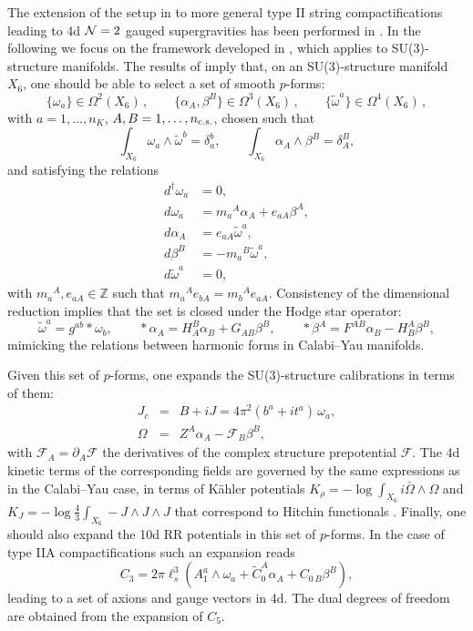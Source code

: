 \documentclass[11pt]{article}
\def\a {\alpha}
\def\b {\beta}
\def\CN {{\cal N}}
\def\be{\begin{equation}}
\def\ee{\end{equation}}
\def\bea{\begin{eqnarray}}
\def\eea{\end{eqnarray}}
\def\bes{\begin{subequations}}
\def\ees{\end{subequations}}
\def\om{\omega}
\def\Om{\Omega}
\def\p {{\partial}}
\newcommand{\cF}{\mathcal{F}}
\newcommand{\IZ}{\mathbb{Z}}
\begin{document}
The extension of the setup in \cite{Gurrieri:2002wz} to more general type II string compactifications leading to 4d $\CN=2$ gauged supergravities has been performed in \cite{DAuria:2004kwe,Grana:2005ny,Kashani-Poor:2006ofe,Grana:2006hr}. In the following we focus on the framework developed in \cite{Grana:2005ny,Kashani-Poor:2006ofe}, which applies to SU(3)-structure manifolds. The results of \cite{Grana:2005ny,Kashani-Poor:2006ofe} imply that, on an SU(3)-structure manifold  $X_6$, one should be able to select a set of smooth $p$-forms:
\be
\{\om_a\} \in \Om^2(X_6)\, , \qquad \{\a_A, \b^B\} \in \Om^3(X_6)\, , \qquad \{\tilde{\om}^a\} \in \Om^4(X_6)\, , 
\ee
with $a=1, \dots, n_K$, $A,B = 1, \dots, n_{\rm c.s.}$, chosen such that 
\be
\int_{X_6} \om_a \wedge \tilde{\om}^b = \delta_a^b , \qquad \int_{X_6}  \a_A \wedge \b^B = \delta_A^B ,
\label{intrel}
\ee
and satisfying the relations 
\bes
\label{system}
\begin{align}
\label{coma}
d^\dag \om_a &= 0 , \\
  d\om_a &=  m_a{}^A \a_A + e_{aA} \b^A , \\
d\a_A &= e_{aA} \tilde{\om}^a , \\
 d\b^B &=  -m_a{}^B \tilde{\om}^a , \\
d\tilde{\om}^a & =  0 ,
\label{doma}
\end{align}
\ees
with $m_a{}^A, e_{aA} \in \IZ$ such that $m_a{}^A e_{bA} = m_b{}^A e_{aA}$. Consistency of the dimensional reduction implies %
that the set is closed under the Hodge star operator:
\be
\tilde{\om}^a =  g^{ab} * \om_b , \qquad * \a_A = H_A^B \a_B + G_{AB}\b^B, \qquad * \b^A = F^{AB} \a_B - H^A_B \b^B ,
\label{hodgen}
\ee
mimicking the relations between harmonic forms in Calabi--Yau manifolds. 

Given this set of $p$-forms, one expands the SU(3)-structure calibrations in terms of them: 
\bea
\label{JcandOmgen}
J_c  &= &B+ iJ = 4\pi^2 (b^a + i t^a) \, \om_a , \\ \nonumber
\Om  &=  & Z^A\a_A - \cF_B\b^B ,
\eea
with $\cF_A = \p_A \cF$ the derivatives of the complex structure prepotential $\cF$. The 4d kinetic terms of the corresponding fields are governed by the same expressions as in the Calabi--Yau case, in terms of K\"ahler potentials  $K_\rho = - \log \int_{X_6} i \bar{\Om} \wedge \Om$ and $K_J = - \log \frac{4}{3}\int_{X_6} - J \wedge J \wedge J$ that correspond to Hitchin functionals  \cite{Grana:2005ny}. Finally, one should also expand the 10d RR potentials in this set of $p$-forms. In the case of type IIA compactifications such an expansion reads
\be
 C_3 = 2\pi \ell_s^3  \left(A_1^a  \wedge \om_a + \tilde{C}_0^A \a_A + C_{0\, B} \b^B\right) ,
 \label{C3gen}
\ee
leading to a set of axions and gauge vectors in 4d. The dual degrees of freedom are obtained from the expansion of $C_5$.
\end{document}
